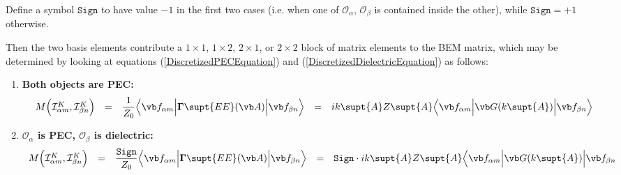 Define a symbol $\texttt{Sign}$ to have value $-1$ in the first
two cases (i.e. when one of $\mathcal{O}_\alpha$, $\mathcal{O}_\beta$
is contained inside the other), while $\texttt{Sign}=+1$ otherwise.

Then the two basis elements contribute a 
$1\times 1$, $1\times 2$, $2\times 1$, or $2\times 2$
block of matrix elements to the BEM matrix, which may be determined
by looking at equations 
(\ref{DiscretizedPECEquation}) 
and 
(\ref{DiscretizedDielectricEquation}) 
as follows:
\begin{enumerate}
\item \textbf{Both objects are PEC:}
$$\begin{array}{lclcl}
   M\Big( \mathcal{I}^K_{\alpha m}, \mathcal{I}^K_{\beta n} \Big) 
  &=&
  \displaystyle{ \frac{1}{Z_0} 
                 \Big\langle 
                 \vb f_{\alpha m} 
                 \Big| \BG\supt{EE}(\vb A) \Big|
                 \vb f_{\beta n} 
                 \Big\rangle
               }
  &=&
  \displaystyle{
  ik\supt{A} Z\supt{A}
                \Big\langle 
                \vb f_{\alpha m} 
                \Big| \vb G(k\supt{A}) \Big|
                \vb f_{\beta n} 
                \Big\rangle
               }
\end{array}$$
\item \textbf{ $\mathcal{O}_\alpha$ is PEC, 
               $\mathcal{O}_\beta$ is dielectric:}
$$\begin{array}{lclcl}
 M\Big( \mathcal{I}^K_{\alpha m}, \mathcal{I}^K_{\beta n} \Big) 
  &=& 
  \displaystyle{ \frac{\texttt{Sign}}{Z_0} 
                 \Big\langle \vb f_{\alpha m} 
                 \Big| \BG\supt{EE}(\vb A) \Big|
                 \vb f_{\beta n} 
                 \Big\rangle
               }
  &=&
  \displaystyle{ \texttt{Sign}\cdot ik\supt{A} Z\supt{A}
                 \Big\langle \vb f_{\alpha m} 
                 \Big| \vb G(k\supt{A}) \Big|
                 \vb f_{\beta n} 
}
\end{array}$$
\end{enumerate}
